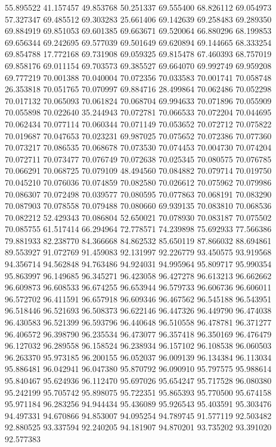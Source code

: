 55.895522
41.157457
49.853768
50.251337
69.555400
68.826112
69.054973
57.327347
69.485512
69.303283
25.661406
69.142639
69.258483
69.289350
69.884919
69.851053
69.601385
69.663671
69.520064
66.880296
68.199853
69.656344
69.242695
69.577039
69.501649
69.620894
69.144665
68.333254
69.854788
17.772168
69.731908
69.059325
69.815478
67.460393
68.757019
69.858176
69.011154
69.703573
69.385527
69.664070
69.992749
69.959208
69.777219
70.001388
70.040004
70.072356
70.033583
70.001741
70.058748
26.353818
70.051765
70.070997
69.884716
28.499864
70.062486
70.052298
70.017132
70.065093
70.061824
70.068704
69.994633
70.071896
70.055909
70.055898
70.022640
35.244943
70.072781
70.066533
70.072204
70.044695
70.062434
70.077114
70.060344
70.071149
70.053652
70.072712
70.075822
70.019687
70.047653
70.023231
69.987025
70.075652
70.072386
70.077360
70.073217
70.086535
70.068678
70.073530
70.074453
70.004730
70.074204
70.072711
70.073477
70.076749
70.072638
70.025345
70.080575
70.076785
70.066291
70.068725
70.079109
48.494560
70.084882
70.079714
70.019750
70.045210
70.076036
70.074859
70.082580
70.026612
70.075962
70.079986
70.086307
70.072498
70.039577
70.080595
70.077863
70.068191
70.083290
70.087903
70.078558
70.079488
70.080660
69.939135
70.083810
70.068536
70.082212
52.429343
70.086804
52.650021
70.078930
70.083187
70.075502
70.085755
61.517414
66.294964
72.778571
74.239898
75.692933
77.566386
79.881933
82.238770
84.366668
84.862532
85.650119
87.866032
88.694861
89.553927
91.072769
91.459083
92.131997
92.226779
93.450575
93.919568
94.356714
94.562848
94.763486
94.924031
94.995964
95.809717
95.990354
95.863997
96.149685
96.345271
96.423058
96.427278
96.613213
96.662662
96.609873
96.608533
96.674255
96.653944
96.579733
96.606736
96.606011
96.572702
96.411591
96.657918
96.609346
96.467562
96.545188
96.543951
96.518446
96.521693
96.508373
96.622146
96.447326
96.449790
96.474038
96.430583
96.521399
96.593796
96.440648
96.510558
96.478781
96.371277
96.406572
96.398790
96.235534
96.473077
96.357418
96.350169
96.476479
96.127032
96.289558
96.158524
96.238934
96.157102
96.108538
96.060503
96.263370
95.973185
96.200155
96.052037
96.009139
96.134384
96.113034
95.886481
96.042941
96.047380
95.870792
96.090910
95.797575
95.988614
95.840467
95.624936
96.112470
95.697026
95.654247
95.717528
96.080380
95.242199
95.705742
95.898075
95.722351
95.865393
95.770500
95.674158
95.971184
96.283256
94.944434
95.436089
95.926543
95.403591
95.303476
94.497331
94.670866
94.853007
94.095254
94.789745
91.577119
92.503482
92.880525
93.337594
92.240205
94.181907
94.870201
93.735202
93.391020
92.577383
